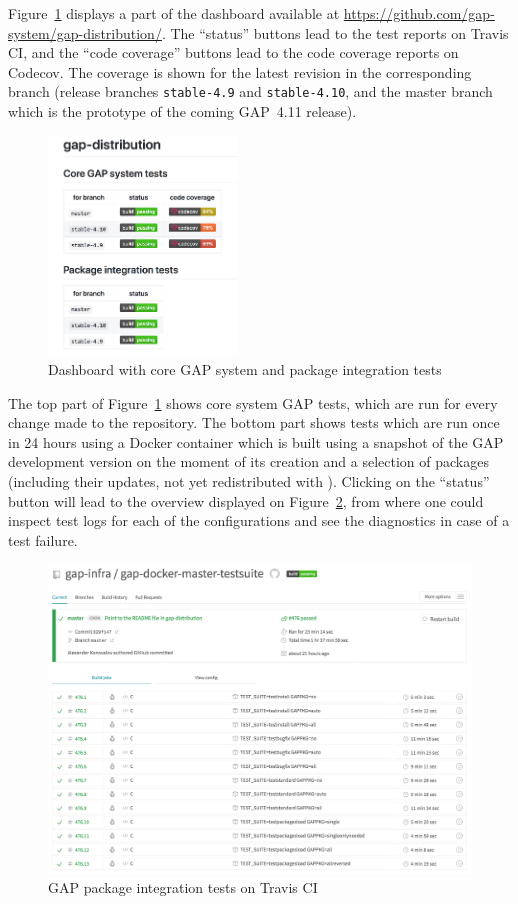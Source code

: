 Figure~\ref{fig:gap-core-tests} displays a part of the dashboard
available at \url{https://github.com/gap-system/gap-distribution/}.
The ``status'' buttons lead to the test reports on Travis CI, and
the ``code coverage'' buttons lead to the code coverage reports on
Codecov. The coverage is shown for the latest revision in the
corresponding branch (release branches {\tt stable-4.9} and {\tt stable-4.10},
and the master branch which is the prototype of the coming GAP~4.11 release).

\begin{figure}[!ht]
    \centering
    \includegraphics[width=5cm]{images/gap-core-tests}
    \caption{Dashboard with core GAP system and package integration tests}
    \label{fig:gap-core-tests}
\end{figure}

The top part of Figure~\ref{fig:gap-core-tests} shows core system GAP tests,
which are run for every change made to the repository. The bottom part shows
tests which are run once in 24 hours using a Docker container which is built
using a snapshot of the GAP development version on the moment of its creation
and a selection of \GAP packages (including their updates, not yet redistributed
with \GAP). Clicking on the ``status'' button will lead to the overview displayed
on Figure~\ref{fig:gap-docker-master-testsuite}, from where one could inspect
test logs for each of the configurations and see the diagnostics in case of a
test failure.

\begin{figure}[!ht]
    \centering
    \includegraphics[width=\textwidth]{images/gap-docker-master-testsuite}
    \caption{GAP package integration tests on Travis CI}
    \label{fig:gap-docker-master-testsuite}
\end{figure}

